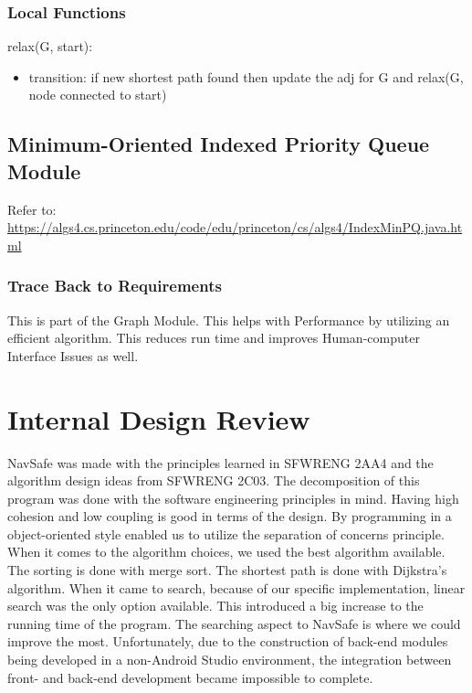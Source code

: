 \documentclass[12pt]{article}
\begin{document}
\subsubsection*{Local Functions}

relax(G, start):
\begin{itemize}
    \item transition: if new shortest path found then update the adj for G and relax(G, node connected to start)
\end{itemize}

\newpage
\subsection{Minimum-Oriented Indexed Priority Queue Module}
Refer to: \url{https://algs4.cs.princeton.edu/code/edu/princeton/cs/algs4/IndexMinPQ.java.html}

\subsubsection*{Trace Back to Requirements}
This is part of the Graph Module. This helps with Performance by utilizing an efficient algorithm. This reduces run time and improves Human-computer Interface Issues as well.

\newpage
\section{Internal Design Review}
NavSafe was made with the principles learned in SFWRENG 2AA4 and the algorithm design ideas from SFWRENG 2C03. The decomposition of this program was done with the software engineering principles in mind. Having high cohesion and low coupling is good in terms of the design. By programming in a object-oriented style enabled us to utilize the separation of concerns principle. When it comes to the algorithm choices, we used the best algorithm available. The sorting is done with merge sort. The shortest path is done with Dijkstra's algorithm. When it came to search, because of our specific implementation, linear search was the only option available. This introduced a big increase to the running time of the program. The searching aspect to NavSafe is where we could improve the most. 
Unfortunately, due to the construction of back-end modules being developed in a non-Android Studio environment, the integration between front- and back-end development became impossible to complete. %
\end{document}

